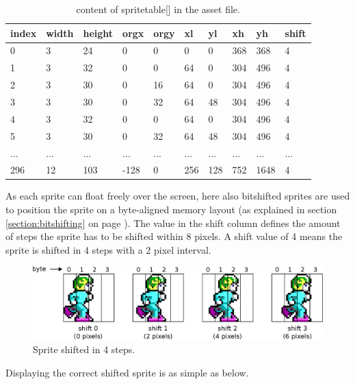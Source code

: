 \documentclass[book.tex]{subfiles}
\begin{document}
\begin{table}[H]
  \begin{tabularx}{\textwidth}[c]{lXXXXXXXXX}
  \hline
  \textbf{index} & \textbf{width} & \textbf{height} & \textbf{orgx} & \textbf{orgy}
    & \textbf{xl} & \textbf{yl} & \textbf{xh} & \textbf{yh} & \textbf{shift} \\ \hline
  0  &   3  &   24  &   0  &   0  &   0  &   0  &   368  &   368  &   4 \\
  1  &   3  &   32  &   0  &   0  &   64  &   0  &   304  &   496  &   4 \\
  2  &   3  &   30  &   0  &   16  &   64  &   0  &   304  &   496  &   4 \\
  3  &   3  &   30  &   0  &   32  &   64  &   48  &   304  &   496  &   4 \\
  4  &   3  &   32  &   0  &   0  &   64  &   0  &   304  &   496  &   4 \\
  5  &   3  &   30  &   0  &   32  &   64  &   48  &   304  &   496  &   4 \\
 ...  &   ...  &   ...  &   ...  &   ...  &   ...  &   ...  &   ...  &   ...  &   ... \\
 296  &   12  &   103  &   -128  &   0  &   256  &   128  &   752  &   1648  &   4\\
  \end{tabularx}
  \caption{content of spritetable[] in the  asset file.}
  \label{table:spritetable}
\end{table}

As each sprite can float freely over the screen, here also bitshifted sprites are used to position the sprite on a byte-aligned memory layout (as explained in section \ref{section:bitshifting} on page \pageref{section:bitshifting}). The value in the shift column defines the amount of steps the sprite has to be shifted within 8 pixels. A shift value of 4 means the sprite is shifted in 4 steps with a 2 pixel interval.\\ 

\begin{figure}[H]
  \centering
  \includegraphics[width=\textwidth]{imgs/drawings/sprite_shift.eps}
  \caption{Sprite shifted in 4 steps.}
  \label{fig:sprite_shift}  
\end{figure}
\par
Displaying the correct shifted sprite is as simple as below.
\\
\par
\begin{minipage}{\textwidth}
  
\end{minipage}
\label{state_type}
\par
\end{document}

